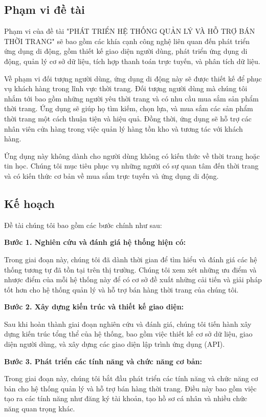 \subsection{Phạm vi đề tài}
Phạm vi của đề tài "PHÁT TRIỂN HỆ THỐNG QUẢN LÝ VÀ HỖ TRỢ BÁN THỜI TRANG" sẽ bao gồm các khía cạnh công nghệ liên quan đến phát triển ứng dụng di động, gồm thiết kế giao diện người dùng, phát triển ứng dụng di động, quản lý cơ sở dữ liệu, tích hợp thanh toán trực tuyến, và phân tích dữ liệu.

Về phạm vi đối tượng người dùng, ứng dụng di động này sẽ được thiết kế để phục vụ khách hàng trong lĩnh vực thời trang. Đối tượng người dùng mà chúng tôi nhắm tới bao gồm những người yêu thời trang và có nhu cầu mua sắm sản phẩm thời trang. Ứng dụng sẽ giúp họ tìm kiếm, chọn lựa, và mua sắm các sản phẩm thời trang một cách thuận tiện và hiệu quả. Đồng thời, ứng dụng sẽ hỗ trợ các nhân viên cửa hàng trong việc quản lý hàng tồn kho và tương tác với khách hàng.

Ứng dụng này không dành cho người dùng không có kiến thức về thời trang hoặc tin học. Chúng tôi mục tiêu phục vụ những người có sự quan tâm đến thời trang và có kiến thức cơ bản về mua sắm trực tuyến và ứng dụng di động.
\subsection{Kế hoạch}
Đề tài chúng tôi bao gồm các bước chính như sau:

\textbf{Bước 1. Nghiên cứu và đánh giá hệ thống hiện có:}

Trong giai đoạn này, chúng tôi đã dành thời gian để tìm hiểu và đánh giá các hệ thống tương tự đã tồn tại trên thị trường. Chúng tôi xem xét những ưu điểm và nhược điểm của mỗi hệ thống này để có cơ sở đề xuất những cải tiến và giải pháp tốt hơn cho hệ thống quản lý và hỗ trợ bán hàng thời trang của chúng tôi.

\textbf{Bước 2. Xây dựng kiến trúc và thiết kế giao diện:}

Sau khi hoàn thành giai đoạn nghiên cứu và đánh giá, chúng tôi tiến hành xây dựng kiến trúc tổng thể của hệ thống, bao gồm việc thiết kế cơ sở dữ liệu, giao diện người dùng, và xây dựng các giao diện lập trình ứng dụng (API).

\textbf{Bước 3. Phát triển các tính năng và chức năng cơ bản:}

Trong giai đoạn này, chúng tôi bắt đầu phát triển các tính năng và chức năng cơ bản cho hệ thống quản lý và hỗ trợ bán hàng thời trang. Điều này bao gồm việc tạo ra các tính năng như đăng ký tài khoản, tạo hồ sơ cá nhân và nhiều chức năng quan trọng khác.

